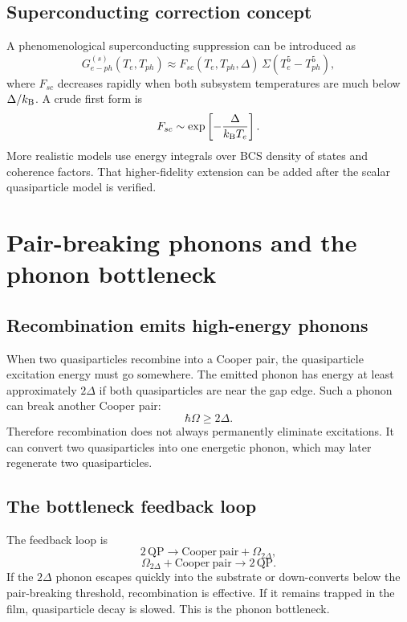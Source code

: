 \documentclass[11pt]{article}
\begin{document}
\subsection{Superconducting correction concept}
A phenomenological superconducting suppression can be introduced as
\begin{equation}
G_{e-ph}^{(s)}(T_e,T_{ph})\approx F_{sc}(T_e,T_{ph},\Delta)\,\Sigma(T_e^5-T_{ph}^5),
\end{equation}
where $F_{sc}$ decreases rapidly when both subsystem temperatures are much below $\Delta/k_{\mathrm{B}}$. A crude first form is
\begin{equation}
F_{sc}\sim\exp\left[-\frac{\Delta}{k_{\mathrm{B}} T_e}\right].
\end{equation}
More realistic models use energy integrals over BCS density of states and coherence factors. That higher-fidelity extension can be added after the scalar quasiparticle model is verified.

\section{Pair-breaking phonons and the phonon bottleneck}

\subsection{Recombination emits high-energy phonons}
When two quasiparticles recombine into a Cooper pair, the quasiparticle excitation energy must go somewhere. The emitted phonon has energy at least approximately $2\Delta$ if both quasiparticles are near the gap edge. Such a phonon can break another Cooper pair:
\begin{equation}
\hbar\Omega\ge2\Delta.
\end{equation}
Therefore recombination does not always permanently eliminate excitations. It can convert two quasiparticles into one energetic phonon, which may later regenerate two quasiparticles.

\subsection{The bottleneck feedback loop}
The feedback loop is
\begin{equation}
2\,\mathrm{QP}\rightarrow\mathrm{Cooper\ pair}+\Omega_{2\Delta},
\end{equation}
\begin{equation}
\Omega_{2\Delta}+\mathrm{Cooper\ pair}\rightarrow2\,\mathrm{QP}.
\end{equation}
If the $2\Delta$ phonon escapes quickly into the substrate or down-converts below the pair-breaking threshold, recombination is effective. If it remains trapped in the film, quasiparticle decay is slowed. This is the phonon bottleneck.
\end{document}
